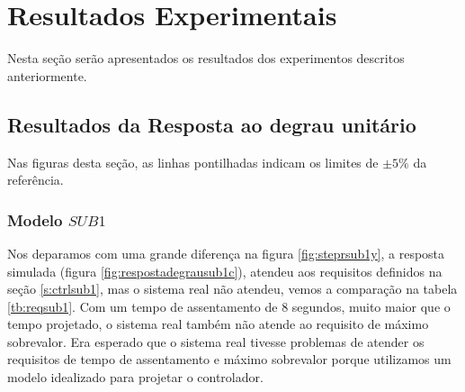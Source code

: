 \section{Resultados Experimentais}
Nesta seção serão apresentados os resultados dos experimentos descritos anteriormente.
\subsection{Resultados da Resposta ao degrau unitário}\label{rstep}

Nas figuras desta seção, as linhas pontilhadas indicam os limites de $\pm 5\%$ da referência.

\subsubsection{Modelo $SUB1$}
Nos deparamos com uma grande diferença na figura \ref{fig:steprsub1y}, a resposta simulada (figura \ref{fig:respostadegrausub1c}), atendeu aos requisitos definidos na seção \ref{s:ctrlsub1}, mas o sistema real não atendeu, vemos a comparação na tabela \ref{tb:reqsub1}. Com um tempo de assentamento de 8 segundos, muito maior que o tempo projetado, o sistema real também não atende ao requisito de máximo sobrevalor. Era esperado que o sistema real tivesse problemas de atender os requisitos de tempo de assentamento e máximo sobrevalor porque utilizamos um modelo idealizado para projetar o controlador.


